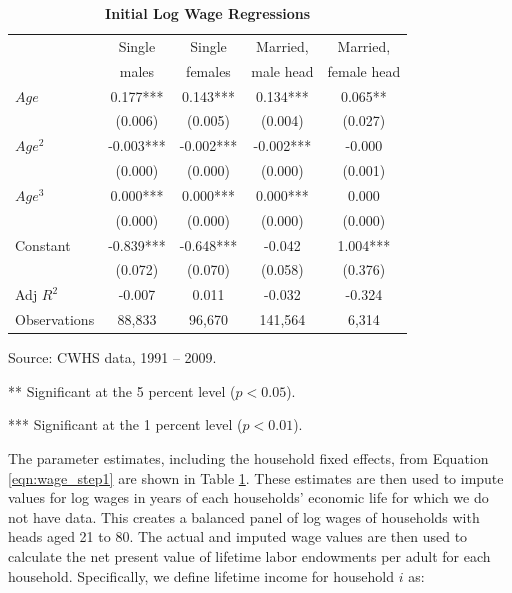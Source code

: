   \begin{table}[htbp]\centering\captionsetup{width=5.8in}
    \caption{\label{tab:wage_step1}\textbf{Initial Log Wage Regressions}}
    \begin{threeparttable}
    \begin{tabular}{>{\scriptsize}l |>{\scriptsize}c >{\scriptsize}c >{\scriptsize}c >{\scriptsize}c}
    \hline\hline
    \multicolumn{1}{c}{\scriptsize{Dependent}} & Single & Single & Married, & Married, \\[-2mm]
    \multicolumn{1}{c}{\scriptsize{variables}}  & males & females & male head  & female head \\
    \hline
    $Age$ & 0.177*** & 0.143*** & 0.134*** & 0.065** \\
          & (0.006) & (0.005) & (0.004) & (0.027) \\
    $Age^{2}$ & -0.003*** & -0.002*** & -0.002*** & -0.000 \\
              & (0.000) & (0.000) & (0.000) & (0.001) \\
    $Age^{3}$ & 0.000*** & 0.000*** & 0.000*** & 0.000 \\
              & (0.000) & (0.000) & (0.000) & (0.000) \\
    Constant & -0.839*** & -0.648*** & -0.042 & 1.004*** \\
             & (0.072) & (0.070) & (0.058) & (0.376) \\
    \hline
    Adj $R^{2}$  & -0.007 & 0.011 & -0.032 & -0.324 \\
    Observations & 88,833 & 96,670 & 141,564 & 6,314 \\
    \hline\hline
    \end{tabular}
    \begin{tablenotes}
      \scriptsize{\item[]Source: CWHS data, 1991 -- 2009.
      \item[**]Significant at the 5 percent level ($p<0.05$).
      \item[***]Significant at the 1 percent level ($p<0.01$).}
    \end{tablenotes}
    \end{threeparttable}
  \end{table}

  The parameter estimates, including the household fixed effects, from Equation \ref{eqn:wage_step1} are shown in Table \ref{tab:wage_step1}. These estimates are then used to impute values for log wages in years of each households' economic life for which we do not have data.  This creates a balanced panel of log wages of households with heads aged 21 to 80. The actual and imputed wage values are then used to calculate the net present value of lifetime labor endowments per adult for each household. Specifically, we define lifetime income for household $i$ as:

